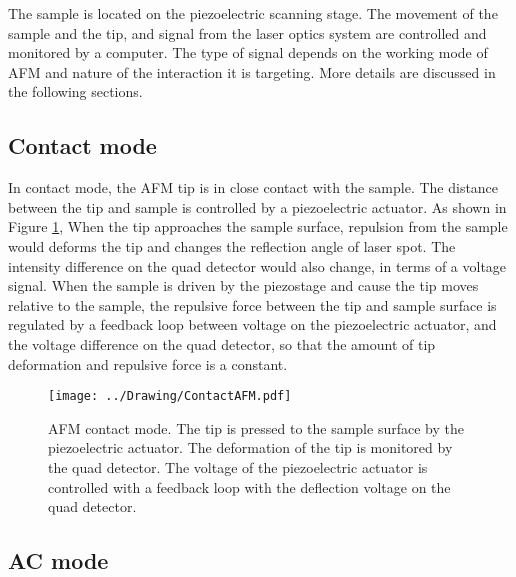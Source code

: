 \documentclass[pdftex, sectionletters]{pittetd}    %
\begin{document}
The sample is located on the piezoelectric scanning stage. The movement of the sample and the tip, and signal from the laser optics system are controlled and monitored by a computer. The type of signal depends on the working mode of AFM and nature of the interaction it is targeting. More details are discussed in the following sections. 

\subsection{Contact mode}

In contact mode, the AFM tip is in close contact with the sample. The distance between the tip and sample is controlled by a piezoelectric actuator. As shown in Figure \ref{FIG:ContactAFM}, When the tip approaches the sample surface, repulsion from the sample would deforms the tip and changes the reflection angle of laser spot. The intensity difference on the quad detector would also change, in terms of a voltage signal. When the sample is driven by the piezostage and cause the tip moves relative to the sample, the repulsive force between the tip and sample surface is regulated by a feedback loop between voltage on the piezoelectric actuator, and the voltage difference on the quad detector, so that the amount of tip deformation and repulsive force is a constant. 

\begin{figure}[h!]
	\centering
	\texttt{[image: ../Drawing/ContactAFM.pdf]}
	\caption{AFM contact mode. The tip is pressed to the sample surface by the piezoelectric actuator. The deformation of the tip is monitored by the quad detector. The voltage of the piezoelectric actuator is controlled with a feedback loop with the deflection voltage on the quad detector.}
	\label{FIG:ContactAFM}
\end{figure}


\subsection{AC mode}
\end{document}
